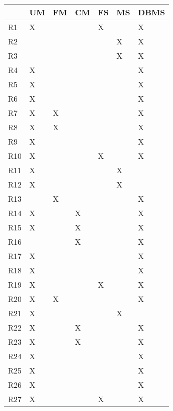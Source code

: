 \begin{table}[]
    \begin{tabular}{|l|l|l|l|l|l|l|}
    \hline
        & UM & FM & CM & FS & MS & DBMS \\ \hline
    R1  & X  &    &    & X  &    & X    \\ \hline
    R2  &    &    &    &    & X  & X    \\ \hline
    R3  &    &    &    &    & X  & X    \\ \hline
    R4  & X  &    &    &    &    & X    \\ \hline
    R5  & X  &    &    &    &    & X    \\ \hline
    R6  & X  &    &    &    &    & X    \\ \hline
    R7  & X  & X  &    &    &    & X    \\ \hline
    R8  & X  & X  &    &    &    & X    \\ \hline
    R9  & X  &    &    &    &    & X    \\ \hline
    R10 & X  &    &    & X  &    & X    \\ \hline
    R11 & X  &    &    &    & X  &      \\ \hline
    R12 & X  &    &    &    & X  &      \\ \hline
    R13 &    & X  &    &    &    & X    \\ \hline
    R14 & X  &    & X  &    &    & X    \\ \hline
    R15 & X  &    & X  &    &    & X    \\ \hline
    R16 &    &    & X  &    &    & X    \\ \hline
    R17 & X  &    &    &    &    & X    \\ \hline
    R18 & X  &    &    &    &    & X    \\ \hline
    R19 & X  &    &    & X  &    & X    \\ \hline
    R20 & X  & X  &    &    &    & X    \\ \hline
    R21 & X  &    &    &    & X  &      \\ \hline
    R22 & X  &    & X  &    &    & X    \\ \hline
    R23 & X  &    & X  &    &    & X    \\ \hline
    R24 & X  &    &    &    &    & X    \\ \hline
    R25 & X  &    &    &    &    & X    \\ \hline
    R26 & X  &    &    &    &    & X    \\ \hline
    R27 & X  &    &    & X  &    & X    \\ \hline

\end{tabular}
\end{table}
